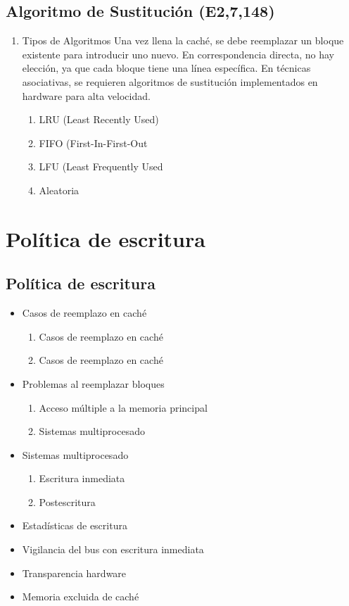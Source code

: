 \documentclass[presentation]{beamer}
\begin{document}
\subsection{Algoritmo de Sustitución (E2,7,148)}
\label{sec:org3721374}
\begin{enumerate}
\item Tipos de Algoritmos
\label{sec:org2667070}
Una vez llena la caché, se debe reemplazar un bloque existente para introducir uno nuevo.
En correspondencia directa, no hay elección, ya que cada bloque tiene una línea específica.
En técnicas asociativas, se requieren algoritmos de sustitución implementados en hardware para alta velocidad.\autocite{stallings2006organización}
\begin{enumerate}
\item LRU (Least Recently Used)
\item FIFO (First-In-First-Out
\item LFU (Least Frequently Used
\item Aleatoria
\end{enumerate}
\end{enumerate}

\section{Política de escritura}
\label{sec:org750b167}
\subsection{Política de escritura}
\label{sec:orgb5fdbe9}
\begin{itemize}
\item Casos de reemplazo en caché
\begin{enumerate}
\item Casos de reemplazo en caché
\item Casos de reemplazo en caché
\end{enumerate}
\item Problemas al reemplazar bloques
\begin{enumerate}
\item Acceso múltiple a la memoria principal
\item Sistemas multiprocesado
\end{enumerate}
\item Sistemas multiprocesado
\begin{enumerate}
\item Escritura inmediata
\item Postescritura
\end{enumerate}
\item Estadísticas de escritura
\item Vigilancia del bus con escritura inmediata
\item Transparencia hardware
\item Memoria excluida de caché
\end{itemize}
\end{document}
